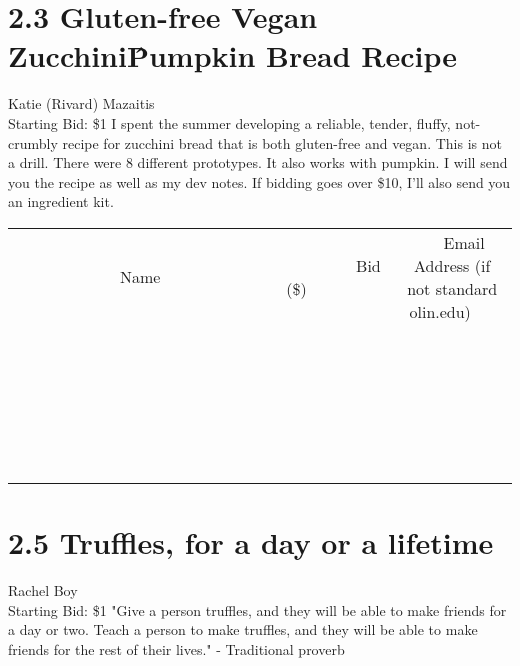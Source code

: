 \documentclass[11pt]{article}
\begin{document}
\section*{2.3 Gluten-free Vegan Zucchini\^Pumpkin Bread Recipe}
Katie (Rivard) Mazaitis
\\
Starting Bid: \$1
\newline
I spent the summer developing a reliable, tender, fluffy, not-crumbly recipe for zucchini bread that is both gluten-free and vegan. This is not a drill. There were 8 different prototypes. It also works with pumpkin. I will send you the recipe as well as my dev notes. If bidding goes over \$10, I'll also send you an ingredient kit.
\\[6ex]
\begin{tabular}{c c c}
~~~~~~~~~~~~~Name~~~~~~~~~~~~~ & ~~~~~~~~~Bid (\$)~~~~~~~~~  & ~~~Email Address (if not standard olin.edu)~~~\\
 & & \\
\hline
 & & \\
\hline
 & & \\
\hline
 & & \\
\hline
 & & \\
\hline
 & & \\
\hline
 & & \\
\hline
 & & \\
\hline
 & & \\
\hline
 & & \\
\hline
 & & \\
\hline
 & & \\
\hline
 & & \\
\hline
 & & \\
\hline
 & & \\
\hline
 & & \\
\hline
 & & \\
\hline
 & & \\
\hline
 & & \\
\hline
 & & \\
\hline
 & & \\
\hline
 & & \\
\hline
 & & \\
\hline
 & & \\
\hline
 & & \\
\hline
 & & \\
\hline
\end{tabular}
\newpage
\section*{2.5 Truffles, for a day or a lifetime}
Rachel Boy
\\
Starting Bid: \$1
\newline
"Give a person truffles, and they will be able to make friends for a day or two. Teach a person to make truffles, and they will be able to make friends for the rest of their lives."
- Traditional proverb
\end{document}
